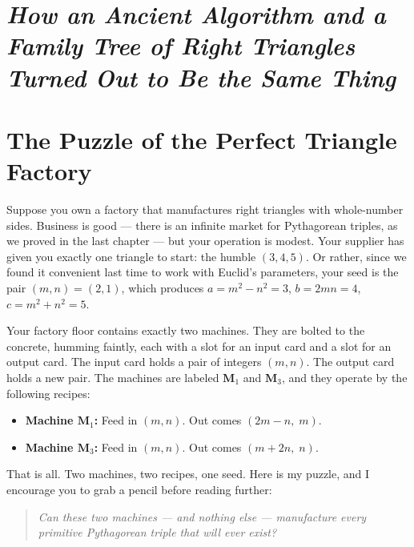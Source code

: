 \section{\texorpdfstring{\emph{How an Ancient Algorithm and a Family Tree of Right Triangles Turned Out to Be the Same Thing}}{How an Ancient Algorithm and a Family Tree of Right Triangles Turned Out to Be the Same Thing}}\label{ch2-how-an-ancient-algorithm-and-a-family-tree-of-right-triangles-turned-out-to-be-the-same-thing}



\section{The Puzzle of the Perfect Triangle Factory}\label{ch2-the-puzzle-of-the-perfect-triangle-factory}

Suppose you own a factory that manufactures right triangles with whole-number sides. Business is good --- there is an infinite market for Pythagorean triples, as we proved in the last chapter --- but your operation is modest. Your supplier has given you exactly one triangle to start: the humble \((3, 4, 5)\). Or rather, since we found it convenient last time to work with Euclid's parameters, your seed is the pair \((m, n) = (2, 1)\), which produces \(a = m^2 - n^2 = 3\), \(b = 2mn = 4\), \(c = m^2 + n^2 = 5\).

Your factory floor contains exactly two machines. They are bolted to the concrete, humming faintly, each with a slot for an input card and a slot for an output card. The input card holds a pair of integers \((m, n)\). The output card holds a new pair. The machines are labeled \(\mathbf{M}_1\) and \(\mathbf{M}_3\), and they operate by the following recipes:

\begin{itemize}

\item
  \textbf{Machine \(\mathbf{M}_1\):} Feed in \((m, n)\). Out comes \((2m - n,\; m)\).
\item
  \textbf{Machine \(\mathbf{M}_3\):} Feed in \((m, n)\). Out comes \((m + 2n,\; n)\).
\end{itemize}

That is all. Two machines, two recipes, one seed. Here is my puzzle, and I encourage you to grab a pencil before reading further:

\begin{quote}
\emph{Can these two machines --- and nothing else --- manufacture every primitive Pythagorean triple that will ever exist?}
\end{quote}

